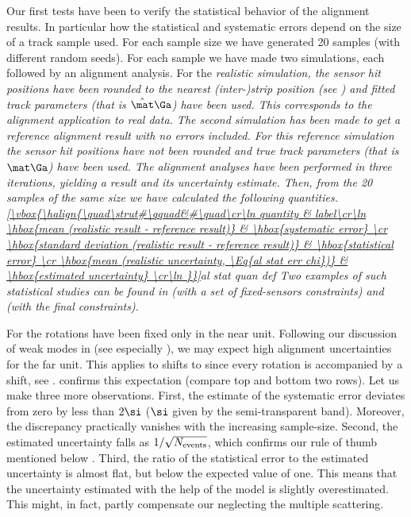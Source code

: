 Our first  tests have been to verify the statistical behavior of the alignment results. In particular how the statistical and systematic errors depend on the size of a track sample used. For each sample size we have generated 20 samples (with different random seeds). For each sample we have made two simulations, each followed by an alignment analysis. For the \em{realistic simulation}, the sensor hit positions have been rounded to the nearest (inter-)strip position (see ) and fitted track parameters (that is $\hat\mat\Ga$) have been used. This corresponds to the alignment application to real data. The second simulation has been made to get a reference alignment result with no errors included. For this \em{reference simulation} the sensor hit positions have not been rounded and true track parameters (that is $\mat\Ga$) have been used. The alignment analyses have been performed in three iterations, yielding a result and its uncertainty estimate. Then, from the 20 samples of the same size we have calculated the following quantities.
\eqref{\vbox{\halign{\quad\strut#\qquad&#\quad\cr\ln
quantity & label\cr\ln
\hbox{mean (realistic result - reference result)}				& \hbox{systematic error} \cr
\hbox{standard deviation (realistic result - reference result)}	& \hbox{statistical error} \cr
\hbox{mean (realistic uncertainty, \Eq{al stat err chi})} 		& \hbox{estimated uncertainty} \cr\ln
}}}{al stat quan def}
Two examples of such statistical studies can be found in  (with a set of fixed-sensors constraints) and  (with the final constraints).

For  the rotations have been fixed only in the near unit. Following our discussion of weak modes in  (see especially ), we may expect high alignment uncertainties for the far unit. This applies to shifts to since every rotation is accompanied by a shift, see .  confirms this expectation (compare top and bottom two rows). Let us make three more observations. First, the estimate of the systematic error deviates from zero by less than $2\si$ ($\si$ given by the semi-transparent band). Moreover, the discrepancy practically vanishes with the increasing sample-size. Second, the estimated uncertainty falls as $1/\sqrt{N_{\rm events}}$, which confirms our rule of thumb mentioned below . Third, the ratio of the statistical error to the estimated uncertainty is almost flat, but below the expected value of one. This means that the uncertainty estimated with the help of the model  is slightly overestimated. This might, in fact, partly compensate our neglecting the multiple scattering.

